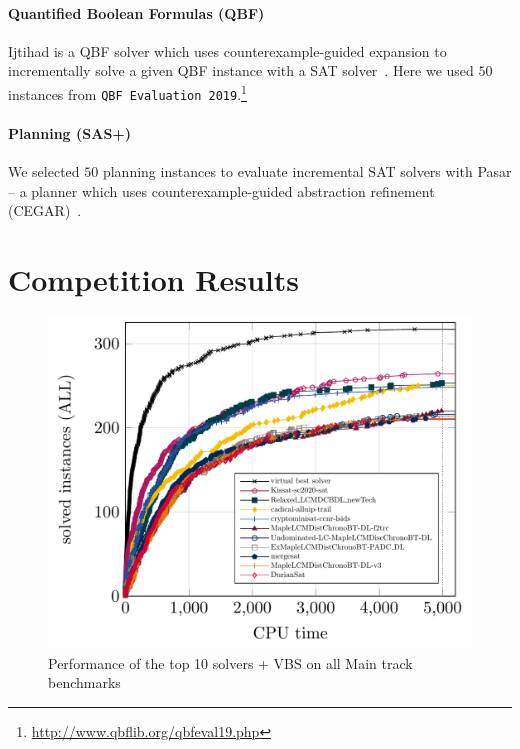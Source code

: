 \documentclass{elsarticle}
\begin{document}
\paragraph{Quantified Boolean Formulas (QBF)}
\textsf{Ijtihad} is a QBF solver which uses counter\-example-guided expansion to incrementally solve a given QBF instance with a SAT solver~\cite{Bloem:2018:QBFSAT}. 
Here we used $50$ instances from \texttt{QBF Evaluation 2019}.\footnote{\url{http://www.qbflib.org/qbfeval19.php}}

\paragraph{Planning (SAS+)}
We selected $50$ planning instances to evaluate incremental SAT solvers with \textsf{Pasar} -- a planner which uses counter\-example-guided abstraction refinement (CEGAR)~\cite{Froleyks:2019:Pasar}. 


\section{Competition Results}
\label{sec:results}


\begin{figure}
\centering
\includegraphics[width=.9\textwidth]{img/paper-main-top10-ALL.pdf}
\caption{Performance of the top 10 solvers + VBS on all  Main track benchmarks}
\end{figure}
\end{document}
